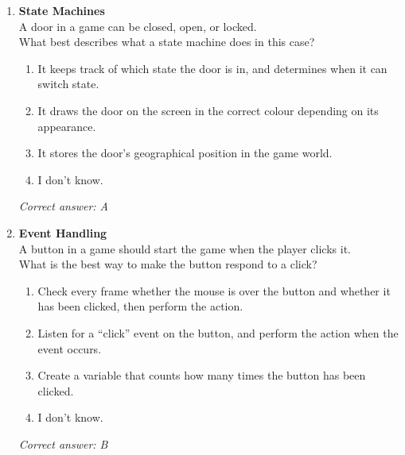 \begin{enumerate}
	\item \textbf{State Machines} \\
	      A door in a game can be closed, open, or locked. \\[0.5em]
	      What best describes what a state machine does in this case?
	      \begin{enumerate}
		      \item It keeps track of which state the door is in, and determines when it can switch state.
		      \item It draws the door on the screen in the correct colour depending on its appearance.
		      \item It stores the door's geographical position in the game world.
		      \item I don't know.
	      \end{enumerate}
	      \textit{Correct answer: A}

	\item \textbf{Event Handling} \\
	      A button in a game should start the game when the player clicks it. \\[0.5em]
	      What is the best way to make the button respond to a click?
	      \begin{enumerate}
		      \item Check every frame whether the mouse is over the button and whether it has been clicked, then perform the action.
		      \item Listen for a ``click'' event on the button, and perform the action when the event occurs.
		      \item Create a variable that counts how many times the button has been clicked.
		      \item I don't know.
	      \end{enumerate}
	      \textit{Correct answer: B}

\end{enumerate}